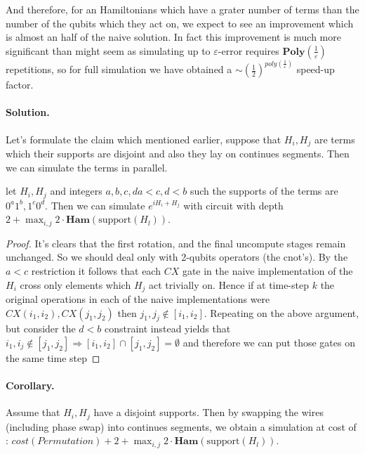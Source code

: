 \documentclass{article}
\begin{document}
And therefore, for an Hamiltonians which have a grater number of terms than the number of the qubits which they act on, we expect to see an improvement which is almost an half of the naive solution. In fact this improvement is much more significant than might seem as simulating up to \(\varepsilon\)-error requires \(\textbf{Poly} \left( \frac{1}{\varepsilon} \right) \) repetitions, so for full simulation we have obtained a \( \sim (\frac{1}{2})^{poly(\frac{1}{\varepsilon})} \) speed-up factor.  

\paragraph{Solution.} Let's formulate the claim which mentioned earlier, suppose that \(H_{i} ,H_{j}\) are terms which their supports are disjoint and also they lay on continues segments. Then we can simulate the terms in parallel. 
\begin{lemma} let \(H_{i}, H_{j}\) and integers \(a,b,c,d a < c, d < b\) such the supports of the terms are \( 0^{a}1^{b}, 1^{c}0^{d}\). Then we can simulate \(e^{i H_{i} + H_{j}}\) with circuit with depth \( 2 + \max_{ {i,j} } 2 \cdot \textbf{Ham} ( \text{support} ( H_{l} ) )\).
\end{lemma}
\begin{proof} It's clears that the first rotation, and the final uncompute stages remain unchanged. So we should deal only with 2-qubits operators (the cnot's). By the \( a < c \) restriction it follows that each \(CX\) gate in the naive implementation of the \(H_i\) cross only elements which \(H_j\) act trivially on. Hence if at time-step \(k\) the original operations in each of the naive implementations were \( CX(i_{1} , i_{2}), CX(j_{1} , j_{2}) \) then \( j_{1}, j_{j} \notin [i_{1} , i_{2}] \). Repeating on the above argument, but consider the \(d<b\) constraint instead yields that \( i_{1}, i_{j} \notin [j_{1} , j_{2}] \Rightarrow [i_{1},i_{2}]\cap[j_{1},j_{2}] = \emptyset  \) and therefore we can put those gates on the same time step   
\end{proof}
\paragraph{Corollary.} Assume that \(H_{i}, H_{j}\) have a disjoint supports. Then by swapping the wires (including phase swap) into continues segments, we obtain a simulation at cost of : \( cost( Permutation ) + 2 + \max_{ {i,j} } 2 \cdot \textbf{Ham} ( \text{support} ( H_{l} ) )\).  
\end{document}
